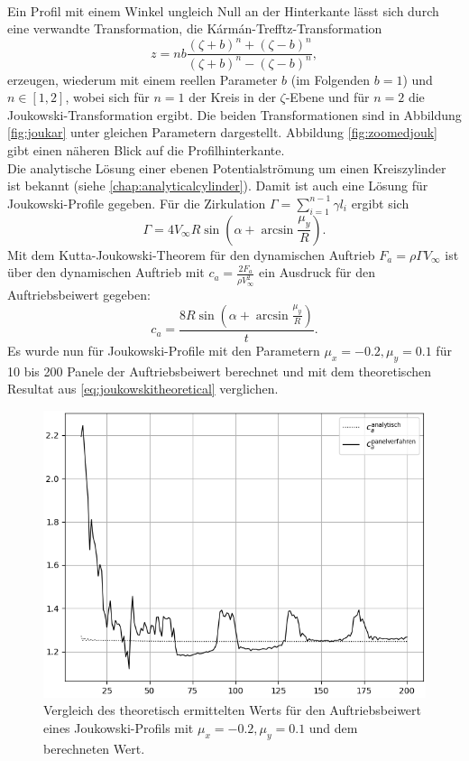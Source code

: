 \\
Ein Profil mit einem Winkel ungleich Null an der Hinterkante lässt sich durch eine verwandte Transformation, die Kármán-Trefftz-Transformation
\begin{equation}
z=nb{\frac {(\zeta +b)^{n}+(\zeta -b)^{n}}{(\zeta +b)^{n}-(\zeta -b)^{n}}},
\end{equation}
erzeugen, wiederum mit einem reellen Parameter $b$ (im Folgenden $b=1$) und $n \in [1,2]$, wobei sich für $n=1$ der Kreis in der $\zeta$-Ebene und für $n=2$ die Joukowski-Transformation ergibt. Die beiden Transformationen sind in Abbildung \ref{fig:joukar} unter gleichen Parametern dargestellt. Abbildung \ref{fig:zoomedjouk} gibt einen näheren Blick auf die Profilhinterkante. \\
Die analytische Lösung einer ebenen Potentialströmung um einen Kreiszylinder ist bekannt (siehe \ref{chap:analyticalcylinder}). Damit ist auch eine Lösung für Joukowski-Profile gegeben. Für die Zirkulation $\Gamma = \sum_{i=1}^{n-1} \gamma l_i$ ergibt sich
\begin{equation}
\Gamma = 4  V_{\infty}R \sin{\left(\alpha + \arcsin \frac{\mu_y}{R} \right)}.
\end{equation}
Mit dem Kutta-Joukowski-Theorem für den dynamischen Auftrieb $F_a = \rho \Gamma V_{\infty}$ ist über den dynamischen Auftrieb mit $c_a = \tfrac{2F_a}{\rho V_{\infty}^2}$ ein Ausdruck für den Auftriebsbeiwert gegeben:
\begin{equation}
\label{eq:joukowskitheoretical}
c_a = \frac{8  R \sin{\left(\alpha + \arcsin \frac{\mu_y}{R} \right)}}{t}.
\end{equation} 
Es wurde nun für Joukowski-Profile mit den Parametern $\mu_x = -0.2, \mu_y =0.1$ für 10 bis 200 Panele der Auftriebsbeiwert berechnet und mit dem theoretischen Resultat aus \eqref{eq:joukowskitheoretical} verglichen. 
\begin{figure}[!ht]
\begin{center} \includegraphics[scale=0.5]{figures/joukowskierror.png} \end{center}
\caption{Vergleich des theoretisch ermittelten Werts für den Auftriebsbeiwert eines Joukowski-Profils mit $\mu_x = -0.2, \mu_y =0.1$ und dem berechneten Wert.}
\label{fig:joukowskitheoretical}
\end{figure}

